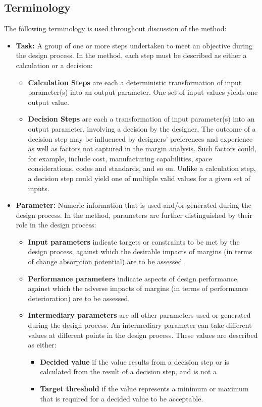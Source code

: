 \subsection{Terminology}\label{terminology}

The following terminology is used throughout discussion of the method:

\begin{itemize}
 \item \textbf{Task:} A group of one or more steps undertaken to meet an objective during the design process. In the method, each step must be described as either a calculation or a decision:
\begin{itemize}
	\item \textbf{Calculation Steps} are each a deterministic transformation of input parameter(s) into an output parameter. One set of input values yields one output value.
	\item \textbf{Decision Steps} are each a transformation of input parameter(s) into an output parameter, involving a decision by the designer. The outcome of a decision step may be influenced by designers' preferences and experience as well as factors not captured in the margin analysis. Such factors could, for example, include cost, manufacturing capabilities, space considerations, codes and standards, and so on. Unlike a calculation step, a decision step could yield one of multiple valid values for a given set of inputs.
\end{itemize}

	\item \textbf{Parameter:} Numeric information that is used and/or generated during the design process. In the method, parameters are further distinguished by their role in the design process:
	\begin{itemize}
		\item \textbf{Input parameters} indicate targets or constraints to be met by the design process, against which the desirable impacts of margins (in terms of change absorption potential) are to be assessed.
		\item \textbf{Performance parameters} indicate aspects of design performance, against which the adverse impacts of margins (in terms of performance deterioration) are to be assessed.
\item \textbf{Intermediary parameters} are all other parameters used or generated during the design process. An intermediary parameter can take different values at different points in the design process. These values are described as either:

	\begin{itemize}

	\item \textbf{Decided value} if the value results from a decision step or is calculated from the result of a decision step, and is not a
	\item \textbf{Target threshold} if the value represents a minimum or maximum that is required for a decided value to be acceptable.
		
	\end{itemize}
	\end{itemize}
	\end{itemize}

